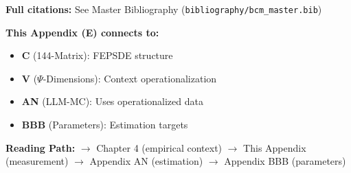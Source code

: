 \textbf{Full citations:} See Master Bibliography (\texttt{bibliography/bcm\_master.bib})


\begin{tcolorbox}[colback=gray!10!white, colframe=gray!75!black,
    title=\textbf{Cross-Reference Footer}]
\label{sec:E-footer}

\textbf{This Appendix (E) connects to:}
\begin{itemize}[nosep]
    \item \textbf{C} (144-Matrix): FEPSDE structure
    \item \textbf{V} ($\Psi$-Dimensions): Context operationalization
    \item \textbf{AN} (LLM-MC): Uses operationalized data
    \item \textbf{BBB} (Parameters): Estimation targets
\end{itemize}

\textbf{Reading Path:}
$\rightarrow$ Chapter 4 (empirical context) $\rightarrow$ This Appendix (measurement)
$\rightarrow$ Appendix AN (estimation) $\rightarrow$ Appendix BBB (parameters)

\end{tcolorbox}
